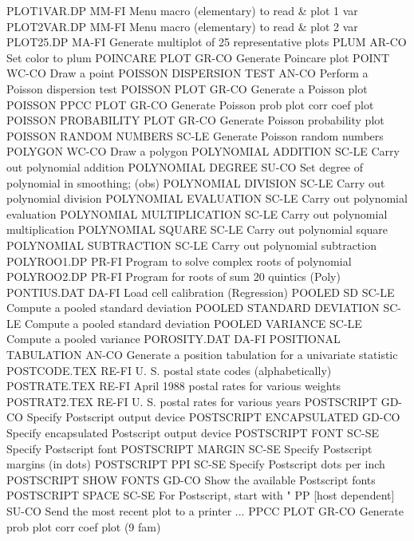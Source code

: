 PLOT1VAR.DP                 MM-FI Menu macro (elementary) to read & plot 1 var
PLOT2VAR.DP                 MM-FI Menu macro (elementary) to read & plot 2 var
PLOT25.DP                   MA-FI Generate multiplot of 25 representative plots
PLUM                        AR-CO Set color to plum
POINCARE PLOT               GR-CO Generate Poincare plot
POINT                       WC-CO Draw a point
POISSON DISPERSION TEST     AN-CO Perform a Poisson dispersion test
POISSON PLOT                GR-CO Generate a Poisson plot
POISSON PPCC PLOT           GR-CO Generate Poisson prob plot corr coef plot
POISSON PROBABILITY PLOT    GR-CO Generate Poisson probability plot
POISSON RANDOM NUMBERS      SC-LE Generate Poisson random numbers
POLYGON                     WC-CO Draw a polygon
POLYNOMIAL ADDITION         SC-LE Carry out polynomial addition
POLYNOMIAL DEGREE           SU-CO Set degree of polynomial in smoothing; (obs)
POLYNOMIAL DIVISION         SC-LE Carry out polynomial division
POLYNOMIAL EVALUATION       SC-LE Carry out polynomial evaluation
POLYNOMIAL MULTIPLICATION   SC-LE Carry out polynomial multiplication
POLYNOMIAL SQUARE           SC-LE Carry out polynomial square
POLYNOMIAL SUBTRACTION      SC-LE Carry out polynomial subtraction
POLYROO1.DP                 PR-FI Program to solve complex roots of polynomial
POLYROO2.DP                 PR-FI Program for roots of sum 20 quintics (Poly)
PONTIUS.DAT                 DA-FI Load cell calibration (Regression)
POOLED SD                   SC-LE Compute a pooled standard deviation
POOLED STANDARD DEVIATION   SC-LE Compute a pooled standard deviation
POOLED VARIANCE             SC-LE Compute a pooled variance
POROSITY.DAT                DA-FI 
POSITIONAL TABULATION       AN-CO Generate a position tabulation for a univariate statistic
POSTCODE.TEX                RE-FI U. S. postal state codes (alphabetically)
POSTRATE.TEX                RE-FI April 1988 postal rates for various weights
POSTRAT2.TEX                RE-FI U. S. postal rates for various years
POSTSCRIPT                  GD-CO Specify Postscript output device
POSTSCRIPT ENCAPSULATED     GD-CO Specify encapsulated Postscript output device
POSTSCRIPT FONT             SC-SE Specify Postscript font
POSTSCRIPT MARGIN           SC-SE Specify Postscript margins (in dots)
POSTSCRIPT PPI              SC-SE Specify Postscript dots per inch
POSTSCRIPT SHOW FONTS       GD-CO Show the available Postscript fonts
POSTSCRIPT SPACE            SC-SE For Postscript, start with "%
PP [host dependent]         SU-CO Send the most recent plot to a printer
... PPCC PLOT               GR-CO Generate prob plot corr coef plot (9 fam)
